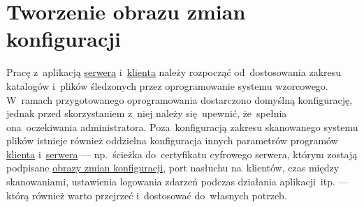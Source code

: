 \documentclass[thesis]{subfiles}
\begin{document}
\section{Tworzenie obrazu zmian konfiguracji}
\label{sec:tworzenie-obrazu-konfiguracji}

Pracę z~aplikacją \hyperref[sec:srv-app]{serwera} i~\hyperref[sec:cli-app]{klienta} należy rozpocząć od~dostosowania zakresu katalogów i~plików śledzonych przez oprogramowanie systemu wzorcowego. W~ramach przygotowanego oprogramowania dostarczono domyślną konfigurację, jednak przed skorzystaniem z~niej należy się~upewnić, że~spełnia ona~oczekiwania administratora. Poza~konfiguracją zakresu skanowanego systemu plików istnieje również oddzielna konfiguracja innych parametrów programów \hyperref[sec:cli-app]{klienta} i~\hyperref[sec:srv-app]{serwera} --- np.~ścieżka do~certyfikatu cyfrowego serwera, którym zostają podpisane \hyperref[sec:obraz-zmian-konfiguracji]{obrazy zmian konfiguracji}, port nasłuchu na~klientów, czas między skanowaniami, ustawienia logowania zdarzeń podczas działania aplikacji~itp. --- którą również warto przejrzeć i~dostosować do~własnych potrzeb.
\end{document}
